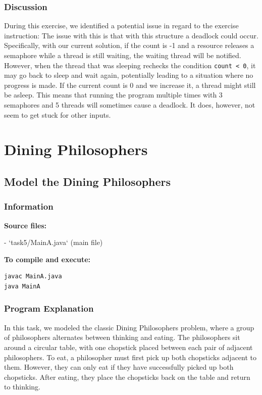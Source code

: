 \documentclass{article}
\begin{document}
\subsubsection{Discussion}
During this exercise, we identified a potential issue in regard to the exercise instruction:  The issue with this is that with this structure a deadlock could occur. Specifically, with our current solution, if the count is -1 and a resource releases a semaphore while a thread is still waiting, the waiting thread will be notified. However, when the thread that was sleeping rechecks the condition \texttt{count < 0}, it may go back to sleep and wait again, potentially leading to a situation where no progress is made. If the current count is 0 and we increase it, a thread might still be asleep. This means that running the program multiple times with 3 semaphores and 5 threads will sometimes cause a deadlock. It does, however, not seem to get stuck for other inputs.


\newpage
\section{Dining Philosophers}
\subsection{Model the Dining Philosophers}

\subsubsection{Information}
\textbf{Source files:}

- `task5/MainA.java` (main file)

\textbf{To compile and execute:}
\begin{lstlisting}[style=bash]
javac MainA.java
java MainA
\end{lstlisting}

\subsubsection{Program Explanation}
In this task, we modeled the classic Dining Philosophers problem, where a group of philosophers alternates between thinking and eating. The philosophers sit around a circular table, with one chopstick placed between each pair of adjacent philosophers. To eat, a philosopher must first pick up both chopsticks adjacent to them. However, they can only eat if they have successfully picked up both chopsticks. After eating, they place the chopsticks back on the table and return to thinking.
\end{document}
